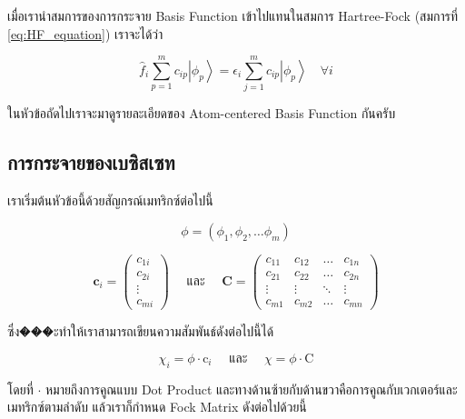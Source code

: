 เมื่อเรานำสมการของการกระจาย Basis Function เข้าไปแทนในสมการ Hartree-Fock (สมการที่ \eqref{eq:HF_equation}) เราจะได้ว่า

\begin{equation}
  \label{eq:HF_equation_LCMO}
  \hat{f}_i \sum_{p=1}^m c_{i p}\left|\phi_p\right\rangle
  =
  \epsilon_i \sum_{j=1}^m c_{i p}\left|\phi_p\right\rangle \quad \forall i
\end{equation}

ในหัวข้อถัดไปเราจะมาดูรายละเอียดของ Atom-centered Basis Function กันครับ

\subsection{การกระจายของเบซิสเซท}

เราเริ่มต้นหัวข้อนี้ด้วยสัญกรณ์เมทริกซ์ต่อไปนี้

\begin{equation}
  \phi
  =
  \left(\phi_1, \phi_2, \dots \phi_m\right)
\end{equation}

\begin{equation}
  \bm{c}_i
  = \left(
  \begin{array}{c}
      c_{1 i} \\
      c_{2 i} \\
      \vdots  \\
      c_{m i}
    \end{array}
  \right)
  \quad \text{ และ } \quad
  \bm{C}
  = \left(
  \begin{array}{cccc}
      c_{11}  & c_{12}  & \ldots & c_{1 n} \\
      c_{21}  & c_{22}  & \ldots & c_{2 n} \\
      \vdots  & \vdots  & \ddots & \vdots  \\
      c_{m 1} & c_{m 2} & \ldots & c_{m n}
    \end{array}
  \right)
\end{equation}

\noindent ซึ่ง���ะทำให้เราสามารถเขียนความสัมพันธ์ดังต่อไปนี้ได้

\begin{equation}
  \chi_i = \phi \cdot \mathrm{c}_i
  \quad \text{ และ } \quad
  \chi = \phi \cdot \mathrm{C}
\end{equation}

\noindent โดยที่ $\cdot$ หมายถึงการคูณแบบ Dot Product และทางด้านซ้ายกับด้านขวาคือการคูณกับเวกเตอร์และเมทริกซ์ตามลำดับ
แล้วเราก็กำหนด Fock Matrix ดังต่อไปด้วยนี้

